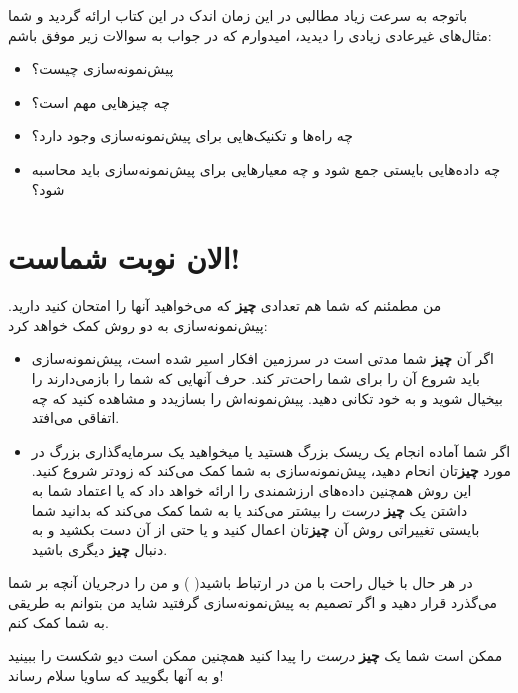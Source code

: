 باتوجه به سرعت زیاد مطالبی در این زمان اندک در این کتاب ارائه گردید و
شما مثال‌های غیرعادی زیادی را دیدید، امیدوارم که در جواب به سوالات زیر
موفق باشم:

\begin{itemize}

\item
  پیش‌نمونه‌سازی چیست؟
\item
  چه چیزهایی مهم است؟
\item
  چه راه‌ها و تکنیک‌هایی برای پیش‌نمونه‌سازی وجود دارد؟
\item
  چه داده‌هایی بایستی جمع شود و چه معیارهایی برای پیش‌نمونه‌سازی باید
  محاسبه شود؟
\end{itemize}

\section{الان نوبت
شماست!}\label{ux627ux644ux627ux646-ux646ux648ux628ux62a-ux634ux645ux627ux633ux62a}

من مطمئنم که شما هم تعدادی \textbf{چیز} که می‌خواهید آنها را امتحان کنید
دارید. پیش‌نمونه‌سازی به دو روش کمک خواهد کرد:

\begin{itemize}

\item
  اگر آن \textbf{چیز} شما مدتی است در سرزمین افکار اسیر شده است،
  پیش‌نمونه‌سازی باید شروع آن را برای شما راحت‌تر کند. حرف آنهایی که شما
  را بازمی‌دارند را بیخیال شوید و به خود تکانی دهید. پیش‌نمونه‌اش را
  بسازیدد و مشاهده کنید که چه اتفاقی می‌افتد.
\item
  اگر شما آماده انجام یک ریسک بزرگ هستید یا میخواهید یک سرمایه‌گذاری
  بزرگ در مورد \textbf{چیز}تان انحام دهید، پیش‌نمونه‌سازی به شما کمک
  می‌کند که زودتر شروع کنید. این روش همچنین داده‌های ارزشمندی را ارائه
  خواهد داد که یا اعتماد شما به داشتن یک \textbf{چیز} \emph{درست} را
  بیشتر می‌کند یا به شما کمک می‌کند که بدانید شما بایستی تغییراتی روش آن
  \textbf{چیز}تان اعمال کنید و یا حتی از آن دست بکشید و به دنبال
  \textbf{چیز} دیگری باشید.
\end{itemize}

در هر حال با خیال راحت با من در ارتباط باشید(  ) و
من را درجریان آنچه بر شما می‌گذرد قرار دهید و اگر تصمیم به
پیش‌نمونه‌سازی گرفتید شاید من بتوانم به طریقی به شما کمک کنم.

ممکن است شما یک \textbf{چیز} \emph{درست} را پیدا کنید همچنین ممکن است
دیو شکست را ببینید و به آنها بگویید که ساویا سلام رساند!
